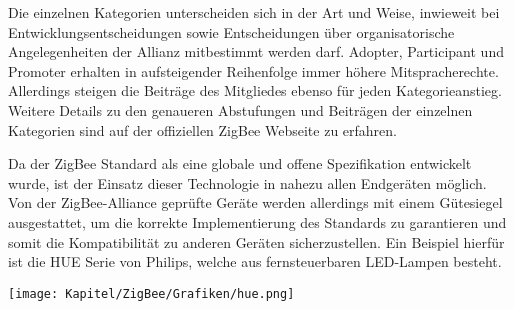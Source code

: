 \begin{multicols}{3}


Die einzelnen Kategorien unterscheiden sich in der Art und Weise, inwieweit bei Entwicklungsentscheidungen sowie Entscheidungen über organisatorische Angelegenheiten der Allianz mitbestimmt werden darf. Adopter, Participant und Promoter erhalten in aufsteigender Reihenfolge immer höhere Mitspracherechte. Allerdings steigen die Beiträge des Mitgliedes ebenso für jeden Kategorieanstieg.~\cite{zigbee.11} Weitere Details zu den genaueren Abstufungen und Beiträgen der einzelnen Kategorien sind auf der offiziellen ZigBee Webseite zu erfahren.
\par Da der ZigBee Standard als eine globale und offene Spezifikation entwickelt wurde, ist der Einsatz dieser Technologie in nahezu allen Endgeräten möglich. Von der ZigBee-Alliance  geprüfte Geräte werden allerdings mit einem Gütesiegel ausgestattet, um die korrekte Implementierung des Standards zu garantieren und somit die Kompatibilität zu anderen Geräten sicherzustellen. Ein Beispiel hierfür ist die HUE Serie von Philips, welche aus fernsteuerbaren LED-Lampen besteht.
\begin{Figure}
\texttt{[image: Kapitel/ZigBee/Grafiken/hue.png]}
\label{fig:vorlage.zemath}
\end{Figure}


\end{multicols}
